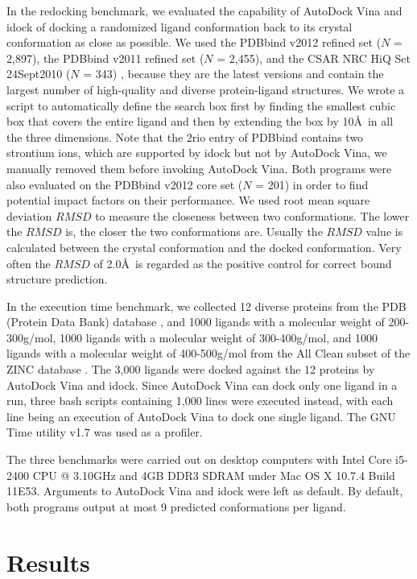 In the redocking benchmark, we evaluated the capability of AutoDock Vina and idock of docking a randomized ligand conformation back to its crystal conformation as close as possible. We used the PDBbind v2012 \citep{529,530} refined set ($N$ = 2,897), the PDBbind v2011 refined set ($N$ = 2,455), and the CSAR NRC HiQ Set 24Sept2010 ($N$ = 343) \citep{857,960}, because they are the latest versions and contain the largest number of high-quality and diverse protein-ligand structures. We wrote a script to automatically define the search box first by finding the smallest cubic box that covers the entire ligand and then by extending the box by 10\AA\ in all the three dimensions. Note that the 2rio entry of PDBbind contains two strontium ions, which are supported by idock but not by AutoDock Vina, we manually removed them before invoking AutoDock Vina. Both programs were also evaluated on the PDBbind v2012 core set ($N$ = 201) in order to find potential impact factors on their performance. We used root mean square deviation $RMSD$ to measure the closeness between two conformations. The lower the $RMSD$ is, the closer the two conformations are. Usually the $RMSD$ value is calculated between the crystal conformation and the docked conformation. Very often the $RMSD$ of 2.0\AA\ is regarded as the positive control for correct bound structure prediction. 

In the execution time benchmark, we collected 12 diverse proteins from the PDB (Protein Data Bank) database \citep{540,537}, and 1000 ligands with a molecular weight of 200-300g/mol, 1000 ligands with a molecular weight of 300-400g/mol, and 1000 ligands with a molecular weight of 400-500g/mol from the All Clean subset of the ZINC database \citep{532,1178}. The 3,000 ligands were docked against the 12 proteins by AutoDock Vina and idock. Since AutoDock Vina can dock only one ligand in a run, three bash scripts containing 1,000 lines were executed instead, with each line being an execution of AutoDock Vina to dock one single ligand. The GNU Time utility v1.7 was used as a profiler.

The three benchmarks were carried out on desktop computers with Intel Core i5-2400 CPU @ 3.10GHz and 4GB DDR3 SDRAM under Mac OS X 10.7.4 Build 11E53. Arguments to AutoDock Vina and idock were left as default. By default, both programs output at most 9 predicted conformations per ligand.

\section{Results}

